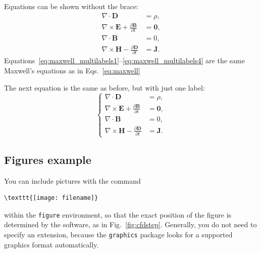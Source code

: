 \documentclass[11pt,a4paper]{article}
\begin{document}
Equations can be shown without the brace:
\begin{align}
    \nabla\cdot \bm{D} & = \rho, \label{eq:maxwell_multilabels1} \\
    \nabla \times \bm{E} +  \frac{\partial \bm{B}}{\partial t} &= \bm{0}, \label{eq:maxwell_multilabels2} \\
    \nabla\cdot \bm{B} & = 0, \label{eq:maxwell_multilabels3} \\
    \nabla \times \bm{H} - \frac{\partial \bm{D}}{\partial t} &= \bm{J} \label{eq:maxwell_multilabels4}.
\end{align}
Equations~\eqref{eq:maxwell_multilabels1}--\eqref{eq:maxwell_multilabels4}
are the same Maxwell's equations as in Eqs.~\eqref{eq:maxwell}


The next equation is the same as before,
but with just one label:
\begin{equation}
    \label{eq:maxwell_singlelabel}
    \left\{
    \begin{aligned}
    \nabla\cdot \bm{D} & = \rho, \\
    \nabla \times \bm{E} +  \frac{\partial \bm{B}}{\partial t} &= \bm{0},\\
    \nabla\cdot \bm{B} & = 0, \\
    \nabla \times \bm{H} - \frac{\partial \bm{D}}{\partial t} &= \bm{J}.
    \end{aligned}
    \right.
\end{equation}

\subsection{Figures example}
\label{subsec:figures}
You can include pictures with the command
\begin{verbatim}
\texttt{[image: filename]}
\end{verbatim}
within the \texttt{figure} environment, so that the exact position of the figure is determined by the software, as in Fig.~\ref{fig:cfdstep}.
Generally, you do not need to specify an extension, because the \texttt{graphics} package looks for a supported graphics format automatically.
\end{document}
